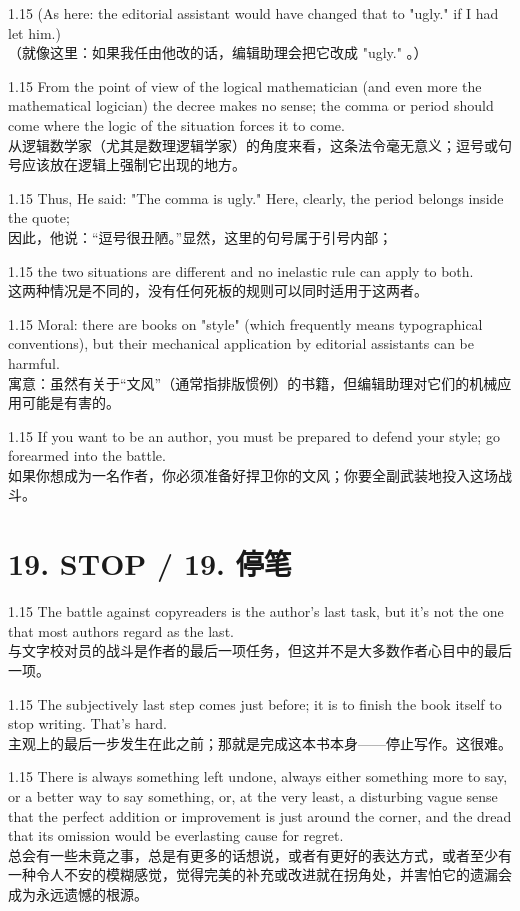 \documentclass[12pt,a4paper]{article}
\newcommand{\bilingual}[2]{
    \begin{spacing}{1.15} %
        \noindent \normalsize #1 \\[-0.5ex] %
        \small \textcolor{blue!70!black}{#2} %
    \end{spacing}
    \vspace{0.8em} %
}
\begin{document}
\bilingual{(As here: the editorial assistant would have changed that to "ugly." if I had let him.)}
{（就像这里：如果我任由他改的话，编辑助理会把它改成 "ugly." 。）} %

\bilingual{From the point of view of the logical mathematician (and even more the mathematical logician) the decree makes no sense; the comma or period should come where the logic of the situation forces it to come.}
{从逻辑数学家（尤其是数理逻辑学家）的角度来看，这条法令毫无意义；逗号或句号应该放在逻辑上强制它出现的地方。} %

\bilingual{Thus, He said: "The comma is ugly." Here, clearly, the period belongs inside the quote;}
{因此，他说：“逗号很丑陋。”显然，这里的句号属于引号内部；} %

\bilingual{the two situations are different and no inelastic rule can apply to both.}
{这两种情况是不同的，没有任何死板的规则可以同时适用于这两者。} %

\bilingual{Moral: there are books on "style" (which frequently means typographical conventions), but their mechanical application by editorial assistants can be harmful.}
{寓意：虽然有关于“文风”（通常指排版惯例）的书籍，但编辑助理对它们的机械应用可能是有害的。} %

\bilingual{If you want to be an author, you must be prepared to defend your style; go forearmed into the battle.}
{如果你想成为一名作者，你必须准备好捍卫你的文风；你要全副武装地投入这场战斗。} %
\section*{19. STOP / 19. 停笔} %

\bilingual{The battle against copyreaders is the author's last task, but it's not the one that most authors regard as the last.}
{与文字校对员的战斗是作者的最后一项任务，但这并不是大多数作者心目中的最后一项。} %

\bilingual{The subjectively last step comes just before; it is to finish the book itself to stop writing. That's hard.}
{主观上的最后一步发生在此之前；那就是完成这本书本身——停止写作。这很难。} %

\bilingual{There is always something left undone, always either something more to say, or a better way to say something, or, at the very least, a disturbing vague sense that the perfect addition or improvement is just around the corner, and the dread that its omission would be everlasting cause for regret.}
{总会有一些未竟之事，总是有更多的话想说，或者有更好的表达方式，或者至少有一种令人不安的模糊感觉，觉得完美的补充或改进就在拐角处，并害怕它的遗漏会成为永远遗憾的根源。} %
\end{document}
